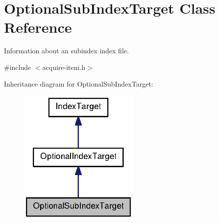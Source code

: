 \section{\-Optional\-Sub\-Index\-Target \-Class \-Reference}
\label{classOptionalSubIndexTarget}


\-Information about an subindex index file.  




{\ttfamily \#include $<$acquire-\/item.\-h$>$}



\-Inheritance diagram for \-Optional\-Sub\-Index\-Target\-:
\nopagebreak
\begin{figure}[H]
\begin{center}
\leavevmode
\includegraphics[width=168pt]{classOptionalSubIndexTarget__inherit__graph}
\end{center}
\end{figure}


